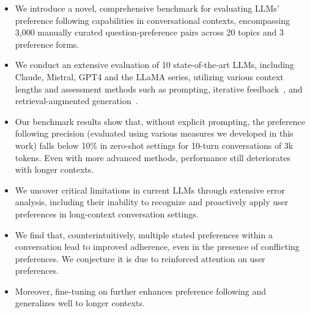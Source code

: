 \begin{itemize}[leftmargin=.1in]

\item We introduce a novel, comprehensive benchmark for evaluating LLMs' preference following capabilities in conversational contexts, encompassing 3,000 manually curated question-preference pairs across 20 topics and 3 preference forms.
\item We conduct an extensive evaluation of 10 state-of-the-art LLMs, including Claude, Mistral, GPT4 and the LLaMA series, utilizing various context lengths and assessment methods such as prompting, iterative feedback~\citep{bai2022constitutional}, and retrieval-augmented generation~\citep{lewis2020retrieval}.
\item Our benchmark results show that, without explicit prompting, the preference following precision (evaluated using various measures we developed in this work) falls below 10\% in zero-shot settings for 10-turn conversations of 3k tokens. Even with more advanced methods, performance still deteriorates with longer contexts.
\item We uncover critical limitations in current LLMs through extensive error analysis, including their inability to recognize and proactively apply user preferences in long-context conversation settings. 

\item We find that, counterintuitively, multiple stated preferences within a conversation lead to improved adherence, even in the presence of conflicting preferences. We conjecture it is due to reinforced attention on user preferences. 


\item Moreover, fine-tuning on \ours{} further enhances preference following and generalizes well to longer contexts.
\end{itemize}

